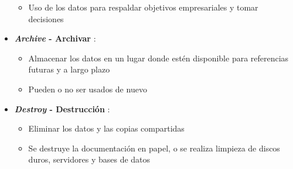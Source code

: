 \begin{itemize}
{\begin{itemize}
        \item {Uso de los datos para respaldar objetivos empresariales y tomar decisiones}
    \end{itemize}}
    \item {\textbf{\textit{Archive} - Archivar} :
    \begin{itemize}
        \item {Almacenar los datos en un lugar donde estén disponible para referencias futuras y a largo plazo}
        \item {Pueden o no ser usados de nuevo}
    \end{itemize}}
    \item {\textbf{\textit{Destroy} - Destrucción} :
    \begin{itemize}
       \item {Eliminar los datos y las copias compartidas}
       \item {Se destruye la documentación en papel, o se realiza limpieza de discos duros, servidores y bases de datos}
    \end{itemize}}
\end{itemize}

